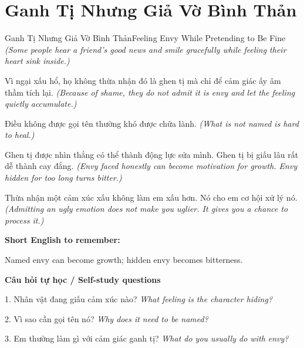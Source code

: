 \section{Ganh Tị Nhưng Giả Vờ Bình Thản}
\begin{truyen}{Ganh Tị Nhưng Giả Vờ Bình Thản}{Feeling Envy While Pretending to Be Fine}
\textit{(Some people hear a friend's good news and smile gracefully while feeling their heart sink inside.)}

Vì ngại xấu hổ, họ không thừa nhận đó là ghen tị mà chỉ để cảm giác ấy âm thầm tích lại.
\textit{(Because of shame, they do not admit it is envy and let the feeling quietly accumulate.)}

Điều không được gọi tên thường khó được chữa lành.
\textit{(What is not named is hard to heal.)}

Ghen tị được nhìn thẳng có thể thành động lực sửa mình. Ghen tị bị giấu lâu rất dễ thành cay đắng.
\textit{(Envy faced honestly can become motivation for growth. Envy hidden for too long turns bitter.)}

\end{truyen}

\begin{baihoc}
Thừa nhận một cảm xúc xấu không làm em xấu hơn. Nó cho em cơ hội xử lý nó.
\textit{(Admitting an ugly emotion does not make you uglier. It gives you a chance to process it.)}
\end{baihoc}

\begin{ghinhoanh}
\textbf{Short English to remember:}

Named envy can become growth; hidden envy becomes bitterness.

\end{ghinhoanh}

\begin{tuhocnhanh}
\textbf{Câu hỏi tự học / Self-study questions}

1. Nhân vật đang giấu cảm xúc nào? \textit{What feeling is the character hiding?}

2. Vì sao cần gọi tên nó? \textit{Why does it need to be named?}

3. Em thường làm gì với cảm giác ganh tị? \textit{What do you usually do with envy?}
\end{tuhocnhanh}
\ngancach

